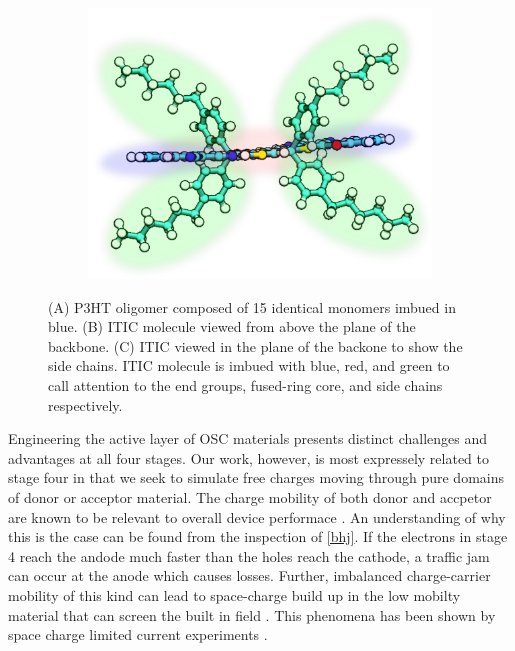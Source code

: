 \begin{figure}[]
\begin{subfigure}{.5\textwidth}
    \includegraphics[width=\textwidth]{figures/itic-sidechain-figure.png}
\end{subfigure}
    \caption[short]{(A) P3HT oligomer composed of 15 identical monomers imbued in blue.
    (B) ITIC molecule viewed from above the plane of the backbone. 
    (C) ITIC viewed in the plane of the backone to show the side chains. ITIC
    molecule is imbued with blue, red, and green to call attention to the end groups, fused-ring core, and
    side chains respectively.}
\label{molecules}
\end{figure}

Engineering the active layer of OSC materials presents distinct challenges and advantages at
all four stages. Our work, however, 
is most expressely related to stage four in that we seek to simulate free charges moving
through pure domains of donor or acceptor material. 
The charge mobility of both donor and accpetor
are known to be relevant to overall device performace \cite{Wang2019e}.
An understanding of why this is the case can be found from the inspection of \autoref{bhj}.
If the electrons in stage 4 reach the andode much faster than the holes reach the cathode, a traffic jam can
occur at the anode which causes losses. 
Further, imbalanced charge-carrier mobility of this kind can lead to space-charge build up in the 
low mobilty material that can screen the built in field \cite{Bartelt2015}.
This phenomena has been shown by space charge limited current experiments \cite{Small2013}.

